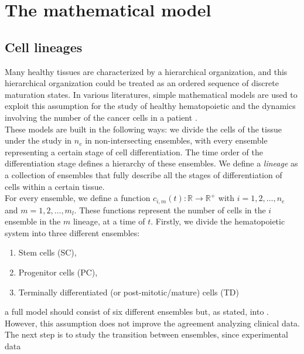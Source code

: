 \documentclass[a4paper,10pt]{article}
\begin{document}
\section{The mathematical model}

\subsection{Cell lineages}
Many healthy tissues are characterized 
by a hierarchical organization, and this hierarchical organization could be treated as
an ordered sequence of discrete maturation states.  In various literatures,
simple mathematical models 
are used to exploit this assumption for the study of healthy hematopoietic \cite{czochra} and
the dynamics involving the number of the cancer cells in a patient
\cite{sottoriva, michor2005,altrock2015mathematics, stiehl2018mathematical, stiehl2012mathematical}.\\
These models are built in the following ways:
\cite{sottoriva, michor2005, tang2011dynamics, olshen2014dynamics, altrock2015mathematics, stiehl2018mathematical, stiehl2012mathematical} 
we divide the cells of the tissue under the study in $n_{e}$ 
in non-intersecting ensembles, with every ensemble 
representing a certain stage of cell differentiation.
The time order of the differentiation stage defines a hierarchy of these ensembles.
We define a \textit{lineage} as a collection of ensembles that fully describe all
the stages of differentiation of cells within a certain tissue.\\ 
For every ensemble, we define a function
$c_{i,m}(t):\mathbb{R}\longrightarrow\mathbb{R}^+$ 
with $i=1,2,\dots,n_{e}$ and $m=1,2,\dots,m_{l}$.
These functions
represent the number of cells in the $i$ ensemble
in the $m$ lineage, at a time of $t$.
Firstly, we divide the hematopoietic system into three different ensembles:
\begin{enumerate}
\item Stem cells (SC),
\item Progenitor cells (PC),
\item Terminally differentiated (or post-mitotic/mature) cells (TD)
\end{enumerate}
a full model should 
consist of six different ensembles but, as stated, into
\cite{sottoriva, stiehl2012mathematical}. However,
this assumption does not improve  the agreement
analyzing clinical data.\\
The next step is to study the transition between ensembles,
since experimental data \cite{michor2005, tang2011dynamics, olshen2014dynamics, rainero2018gdna} 
\end{document}
